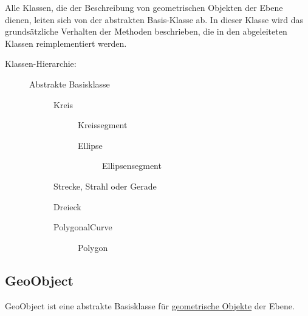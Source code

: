 
Alle Klassen, die der Beschreibung von geometrischen Objekten der Ebene 
dienen, leiten sich von der abstrakten Basis-Klasse  ab.
In dieser Klasse wird das grundsätzliche Verhalten der Methoden 
beschrieben, die in den abgeleiteten Klassen reimplementiert werden. 

\vspace{1cm}
\noindent
Klassen-Hierarchie:

\begin{description}
\item[] Abstrakte Basisklasse
\begin{description}
\item[] Kreis
\begin{description}
\item[] Kreissegment
\item[] Ellipse
\begin{description}
\item[] Ellipsensegment
\end{description}
\end{description}
\item[] Strecke, Strahl oder Gerade
\item[] Dreieck
\item[] PolygonalCurve
\begin{description}
\item[] Polygon
\end{description}
\end{description}
\end{description}

\subsection{GeoObject}
\hypertarget{GeoObject}{}
\label{GeoObject}

GeoObject ist eine abstrakte Basisklasse für 
\hyperlink{geometricObject}{geometrische Objekte} der Ebene.


